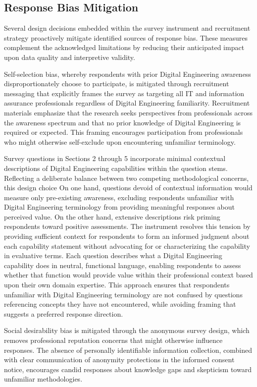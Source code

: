 \subsection{Response Bias Mitigation}

Several design decisions embedded within the survey instrument and recruitment strategy proactively mitigate identified sources of response bias. These measures complement the acknowledged limitations by reducing their anticipated impact upon data quality and interpretive validity.

Self-selection bias, whereby respondents with prior Digital Engineering awareness disproportionately choose to participate, is mitigated through recruitment messaging that explicitly frames the survey as targeting all IT and information assurance professionals regardless of Digital Engineering familiarity. Recruitment materials emphasize that the research seeks perspectives from professionals across the awareness spectrum and that no prior knowledge of Digital Engineering is required or expected. This framing encourages participation from professionals who might otherwise self-exclude upon encountering unfamiliar terminology.

Survey questions in Sections 2 through 5 incorporate minimal contextual descriptions of Digital Engineering capabilities within the question stems. Reflecting a deliberate balance between two competing methodological concerns, this design choice On one hand, questions devoid of contextual information would measure only pre-existing awareness, excluding respondents unfamiliar with Digital Engineering terminology from providing meaningful responses about perceived value. On the other hand, extensive descriptions risk priming respondents toward positive assessments. The instrument resolves this tension by providing sufficient context for respondents to form an informed judgment about each capability statement without advocating for or characterizing the capability in evaluative terms. Each question describes what a Digital Engineering capability does in neutral, functional language, enabling respondents to assess whether that function would provide value within their professional context based upon their own domain expertise. This approach ensures that respondents unfamiliar with Digital Engineering terminology are not confused by questions referencing concepts they have not encountered, while avoiding framing that suggests a preferred response direction.

Social desirability bias is mitigated through the anonymous survey design, which removes professional reputation concerns that might otherwise influence responses. The absence of personally identifiable information collection, combined with clear communication of anonymity protections in the informed consent notice, encourages candid responses about knowledge gaps and skepticism toward unfamiliar methodologies.

